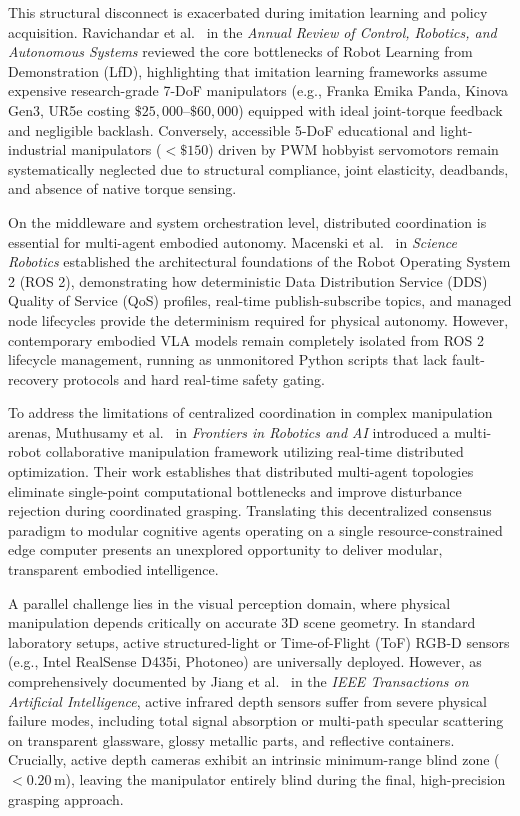 \documentclass[journal]{IEEEtran}
\begin{document}
This structural disconnect is exacerbated during imitation learning and policy acquisition. Ravichandar et al.~\cite{aria_001_ravichandar_2020_recent} in the \textit{Annual Review of Control, Robotics, and Autonomous Systems} reviewed the core bottlenecks of Robot Learning from Demonstration (LfD), highlighting that imitation learning frameworks assume expensive research-grade 7-DoF manipulators (e.g., Franka Emika Panda, Kinova Gen3, UR5e costing $\$25,000\text{--}\$60,000$) equipped with ideal joint-torque feedback and negligible backlash. Conversely, accessible 5-DoF educational and light-industrial manipulators ($<\$150$) driven by PWM hobbyist servomotors remain systematically neglected due to structural compliance, joint elasticity, deadbands, and absence of native torque sensing.

On the middleware and system orchestration level, distributed coordination is essential for multi-agent embodied autonomy. Macenski et al.~\cite{aria_022_macenski_2022_robot} in \textit{Science Robotics} established the architectural foundations of the Robot Operating System 2 (ROS 2), demonstrating how deterministic Data Distribution Service (DDS) Quality of Service (QoS) profiles, real-time publish-subscribe topics, and managed node lifecycles provide the determinism required for physical autonomy. However, contemporary embodied VLA models remain completely isolated from ROS 2 lifecycle management, running as unmonitored Python scripts that lack fault-recovery protocols and hard real-time safety gating.

To address the limitations of centralized coordination in complex manipulation arenas, Muthusamy et al.~\cite{aria_008_muthusamy_2025_a} in \textit{Frontiers in Robotics and AI} introduced a multi-robot collaborative manipulation framework utilizing real-time distributed optimization. Their work establishes that distributed multi-agent topologies eliminate single-point computational bottlenecks and improve disturbance rejection during coordinated grasping. Translating this decentralized consensus paradigm to modular cognitive agents operating on a single resource-constrained edge computer presents an unexplored opportunity to deliver modular, transparent embodied intelligence.

A parallel challenge lies in the visual perception domain, where physical manipulation depends critically on accurate 3D scene geometry. In standard laboratory setups, active structured-light or Time-of-Flight (ToF) RGB-D sensors (e.g., Intel RealSense D435i, Photoneo) are universally deployed. However, as comprehensively documented by Jiang et al.~\cite{aria_113_jiang_2023_robotic} in the \textit{IEEE Transactions on Artificial Intelligence}, active infrared depth sensors suffer from severe physical failure modes, including total signal absorption or multi-path specular scattering on transparent glassware, glossy metallic parts, and reflective containers. Crucially, active depth cameras exhibit an intrinsic minimum-range blind zone ($<0.20$\,m), leaving the manipulator entirely blind during the final, high-precision grasping approach.
\end{document}
